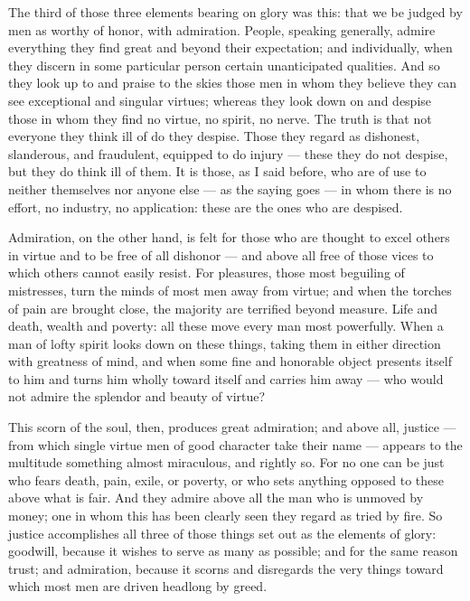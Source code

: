  The third of those three elements bearing on glory was this: that we be judged by men as worthy of honor, with admiration. People, speaking generally, admire everything they find great and beyond their expectation; and individually, when they discern in some particular person certain unanticipated qualities. And so they look up to and praise to the skies those men in whom they believe they can see exceptional and singular virtues; whereas they look down on and despise those in whom they find no virtue, no spirit, no nerve. The truth is that not everyone they think ill of do they despise. Those they regard as dishonest, slanderous, and fraudulent, equipped to do injury — these they do not despise, but they do think ill of them. It is those, as I said before, who are of use to neither themselves nor anyone else — as the saying goes — in whom there is no effort, no industry, no application: these are the ones who are despised.

 Admiration, on the other hand, is felt for those who are thought to excel others in virtue and to be free of all dishonor — and above all free of those vices to which others cannot easily resist. For pleasures, those most beguiling of mistresses, turn the minds of most men away from virtue; and when the torches of pain are brought close, the majority are terrified beyond measure. Life and death, wealth and poverty: all these move every man most powerfully. When a man of lofty spirit looks down on these things, taking them in either direction with greatness of mind, and when some fine and honorable object presents itself to him and turns him wholly toward itself and carries him away — who would not admire the splendor and beauty of virtue?

 This scorn of the soul, then, produces great admiration; and above all, justice — from which single virtue men of good character take their name — appears to the multitude something almost miraculous, and rightly so. For no one can be just who fears death, pain, exile, or poverty, or who sets anything opposed to these above what is fair. And they admire above all the man who is unmoved by money; one in whom this has been clearly seen they regard as tried by fire. So justice accomplishes all three of those things set out as the elements of glory: goodwill, because it wishes to serve as many as possible; and for the same reason trust; and admiration, because it scorns and disregards the very things toward which most men are driven headlong by greed.

